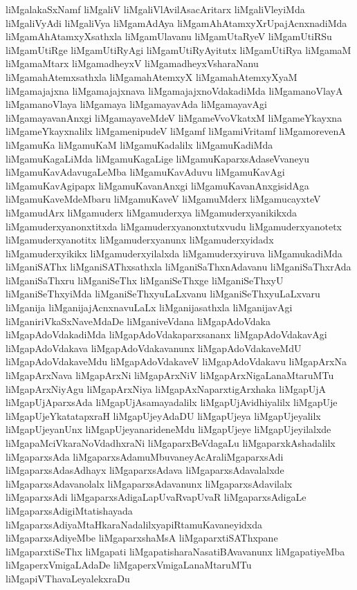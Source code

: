 {liMgalakaSxNamf
liMgaliV
liMgaliVlAvilAsacAritarx
liMgaliVleyiMda
liMgaliVyAdi
liMgaliVya
liMgamAdAya
liMgamAhAtamxyXrUpajAcnxnadiMda
liMgamAhAtamxyXsathxla
liMgamUlavanu
liMgamUtaRyeV
liMgamUtiRSu
liMgamUtiRge
liMgamUtiRyAgi
liMgamUtiRyAyitutx
liMgamUtiRya
liMgamaM
liMgamaMtarx
liMgamadheyxV
liMgamadheyxVsharaNanu
liMgamahAtemxsathxla
liMgamahAtemxyX
liMgamahAtemxyXyaM
liMgamajajxna
liMgamajajxnava
liMgamajajxnoVdakadiMda
liMgamanoVlayA
liMgamanoVlaya
liMgamaya
liMgamayavAda
liMgamayavAgi
liMgamayavanAnxgi
liMgamayaveMdeV
liMgameVvoVkatxM
liMgameYkayxna
liMgameYkayxnalilx
liMgamenipudeV
liMgamf
liMgamiVritamf
liMgamorevenA
liMgamuKa
liMgamuKaM
liMgamuKadalilx
liMgamuKadiMda
liMgamuKagaLiMda
liMgamuKagaLige
liMgamuKaparxsAdaseVvaneyu
liMgamuKavAdavugaLeMba
liMgamuKavAduvu
liMgamuKavAgi
liMgamuKavAgipapx
liMgamuKavanAnxgi
liMgamuKavanAnxgisidAga
liMgamuKaveMdeMbaru
liMgamuKaveV
liMgamuMderx
liMgamucayxteV
liMgamudArx
liMgamuderx
liMgamuderxya
liMgamuderxyanikikxda
liMgamuderxyanonxtitxda
liMgamuderxyanonxtutxvudu
liMgamuderxyanotetx
liMgamuderxyanotitx
liMgamuderxyanunx
liMgamuderxyidadx
liMgamuderxyikikx
liMgamuderxyilalxda
liMgamuderxyiruva
liMgamukadiMda
liMganiSAThx
liMganiSAThxsathxla
liMganiSaThxnAdavanu
liMganiSaThxrAda
liMganiSaThxru
liMganiSeThx
liMganiSeThxge
liMganiSeThxyU
liMganiSeThxyiMda
liMganiSeThxyuLaLxvanu
liMganiSeThxyuLaLxvaru
liMganija
liMganijajAcnxnavuLaLx
liMganijasathxla
liMganijavAgi
liMganiriVkaSxNaveMdaDe
liMganiveVdana
liMgapAdoVdaka
liMgapAdoVdakadiMda
liMgapAdoVdakaparxsananx
liMgapAdoVdakavAgi
liMgapAdoVdakava
liMgapAdoVdakavanunx
liMgapAdoVdakaveMdU
liMgapAdoVdakaveMdu
liMgapAdoVdakaveV
liMgapAdoVdakavu
liMgapArxNa
liMgapArxNava
liMgapArxNi
liMgapArxNiV
liMgapArxNigaLanaMtaruMTu
liMgapArxNiyAgu
liMgapArxNiya
liMgapAxNaparxtigArxhaka
liMgapUjA
liMgapUjAparxsAda
liMgapUjAsamayadalilx
liMgapUjAvidhiyalilx
liMgapUje
liMgapUjeYkatatapxraH
liMgapUjeyAdaDU
liMgapUjeya
liMgapUjeyalilx
liMgapUjeyanUnx
liMgapUjeyanarideneMdu
liMgapUjeye
liMgapUjeyilalxde
liMgapaMciVkaraNoVdadhxraNi
liMgaparxBeVdagaLu
liMgaparxkAshadalilx
liMgaparxsAda
liMgaparxsAdamuMbuvaneyAcAraliMgaparxsAdi
liMgaparxsAdasAdhayx
liMgaparxsAdava
liMgaparxsAdavalalxde
liMgaparxsAdavanolalx
liMgaparxsAdavanunx
liMgaparxsAdavilalx
liMgaparxsAdi
liMgaparxsAdigaLapUvaRvapUvaR
liMgaparxsAdigaLe
liMgaparxsAdigiMtatishayada
liMgaparxsAdiyaMtaHkaraNadalilxyapiRtamuKavaneyidxda
liMgaparxsAdiyeMbe
liMgaparxshaMsA
liMgaparxtiSAThxpane
liMgaparxtiSeThx
liMgapati
liMgapatisharaNasatiBAvavanunx
liMgapatiyeMba
liMgaperxVmigaLAdaDe
liMgaperxVmigaLanaMtaruMTu
liMgapiVThavaLeyalekxraDu
}
